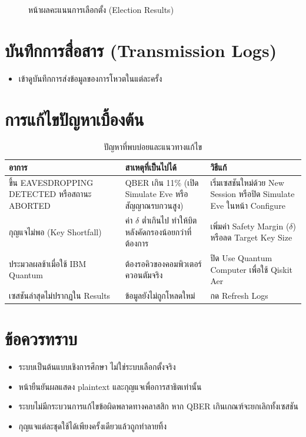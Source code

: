 \begin{figure}[htbp]
\centering
{}
\caption{หน้าผลคะแนนการเลือกตั้ง (Election Results)}
\label{fig:manual-election-results}
\end{figure}

\section{บันทึกการสื่อสาร (Transmission Logs)}

\begin{itemize}
  \item เข้าดูบันทึกการส่งข้อมูลของการโหวตในแต่ละครั้ง
\end{itemize}

\section{การแก้ไขปัญหาเบื้องต้น}

\begin{table}[htbp]
\centering
\begin{tabular}{|p{3.6cm}|p{4.2cm}|p{4.8cm}|}
\hline
\textbf{อาการ} & \textbf{สาเหตุที่เป็นไปได้} & \textbf{วิธีแก้} \\ \hline
ขึ้น EAVESDROPPING DETECTED หรือสถานะ ABORTED & QBER เกิน 11\% (เปิด Simulate Eve หรือสัญญาณรบกวนสูง) & เริ่มเซสชันใหม่ด้วย New Session หรือปิด Simulate Eve ในหน้า Configure \\ \hline
กุญแจไม่พอ (Key Shortfall) & ค่า $\delta$ ต่ำเกินไป ทำให้บิตหลังคัดกรองน้อยกว่าที่ต้องการ & เพิ่มค่า Safety Margin ($\delta$) หรือลด Target Key Size \\ \hline
ประมวลผลช้าเมื่อใช้ IBM Quantum & ต้องรอคิวของคอมพิวเตอร์ควอนตัมจริง & ปิด Use Quantum Computer เพื่อใช้ Qiskit Aer \\ \hline
เซสชันล่าสุดไม่ปรากฏใน Results & ข้อมูลยังไม่ถูกโหลดใหม่ & กด Refresh Logs \\ \hline

\end{tabular}
\caption{ปัญหาที่พบบ่อยและแนวทางแก้ไข}
\label{tab:manual-trouble}
\end{table}

\section{ข้อควรทราบ}
\begin{itemize}
  \item ระบบเป็นต้นแบบเชิงการศึกษา ไม่ใช่ระบบเลือกตั้งจริง
  \item หน้ายืนยันผลแสดง plaintext และกุญแจเพื่อการสาธิตเท่านั้น
  \item ระบบไม่มีกระบวนการแก้ไขข้อผิดพลาดทางคลาสสิก หาก QBER เกินเกณฑ์จะยกเลิกทั้งเซสชัน
  \item กุญแจแต่ละชุดใช้ได้เพียงครั้งเดียวแล้วถูกทำลายทิ้ง
\end{itemize}